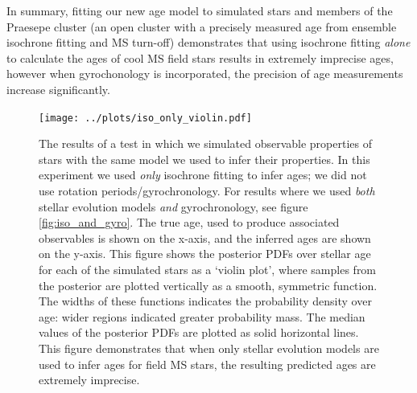 In summary, fitting our new age model to simulated stars and members of the
Praesepe cluster (an open cluster with a precisely measured age from ensemble
isochrone fitting and MS turn-off) demonstrates that using isochrone fitting
{\it alone} to calculate the ages of cool MS field stars results in
extremely imprecise ages, however when gyrochonology is incorporated, the
precision of age measurements increase significantly.

\begin{figure}
  \caption{
The results of a test in which we simulated observable properties of stars
    with the same model we used to infer their properties.
In this experiment we used {\it only} isochrone fitting to infer ages;
we did not use rotation periods/gyrochronology.
    For results where we used {\it both} stellar evolution models {\it and}
    gyrochronology, see figure \ref{fig:iso_and_gyro}.
The true age, used to produce associated observables is shown on the x-axis,
    and the inferred ages are shown on the y-axis.
This figure shows the posterior PDFs over stellar age for each of the
    simulated stars as a `violin plot', where samples from the posterior are
    plotted vertically as a smooth, symmetric function.
The widths of these functions indicates the probability density over age:
    wider regions indicated greater probability mass.
The median values of the posterior PDFs are plotted as solid horizontal lines.
This figure demonstrates that when only stellar evolution models are used to
    infer ages for field MS stars, the resulting predicted ages are extremely
    imprecise.
}
  \centering
    \texttt{[image: ../plots/iso\_only\_violin.pdf]}
\label{fig:iso_only}
\end{figure}

